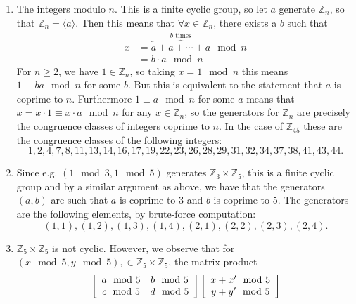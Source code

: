 \documentclass{article}
\begin{document}
\begin{Answer}
\begin{enumerate}
  \item{The integers modulo $n$. This is a finite cyclic group, so let
        $a$ generate $\mathbb{Z}_n$, so
        that $\mathbb{Z}_n = \langle a \rangle$. Then this means that
        $\forall x \in \mathbb{Z}_n$, there exists a $b$ such that
       \begin{align*}
        x 
        &=
          \overbrace{a + a + \cdots + a}^{b \text{ times}} \mod n \\
        &=
          b \cdot a \mod n
        \end{align*}
        For $n \geq 2$, we have $1 \in \mathbb{Z}_n$, so taking $x =
        1 \mod n$ this means
        $1 \equiv b a \mod n$ for some $b$. But this is equivalent to
        the statement that $a$ is coprime to $n$. Furthermore
        $1 \equiv a \mod n$ for some $a$ means that
        $x = x \cdot 1 \equiv x \cdot a \mod n$ for any 
        $x \in \mathbb{Z}_n$, so the generators for $\mathbb{Z}_n$ are
        precisely the congruence classes of integers coprime to
        $n$. In the case of $\mathbb{Z}_{45}$ these are the congruence
        classes of the following integers:
        $$
        1, 2, 4, 7, 8, 11, 13, 14, 16, 17, 19, 22, 23, 26, 28, 29,
        31, 32, 34, 37, 38, 41, 43, 44.
        $$
      }
  \item{Since e.g. $(1 \mod 3, 1 \mod 5)$ generates 
        $\mathbb{Z}_3 \times \mathbb{Z}_5$, this is a finite cyclic
        group and by a similar argument as above, we have that the
        generators $(a, b)$ are such that $a$ is coprime to 3 and
        $b$ is coprime to 5. The generators are the 
        following elements, by brute-force computation:
        $$
        (1,1),(1,2),(1,3),(1,4),(2,1),(2,2),(2,3),(2,4).
        $$
       }
  \item{$\mathbb{Z}_5 \times \mathbb{Z}_5$ is not cyclic. However, we
        observe that for 
        $(x \mod 5, y \mod 5),
        \in \mathbb{Z}_5 \times \mathbb{Z}_5$, the matrix product
        \begin{align*}
        &\left[\begin{array}{c c}
           a \mod 5 & b \mod 5 \\
           c \mod 5 & d \mod 5
         \end{array}\right]
         \left[\begin{array}{c}
           x + x^\prime \mod 5 \\ y + y^\prime \mod 5
         \end{array}\right] \\

\end{align*}}
\end{enumerate}
\end{Answer}
\end{document}

